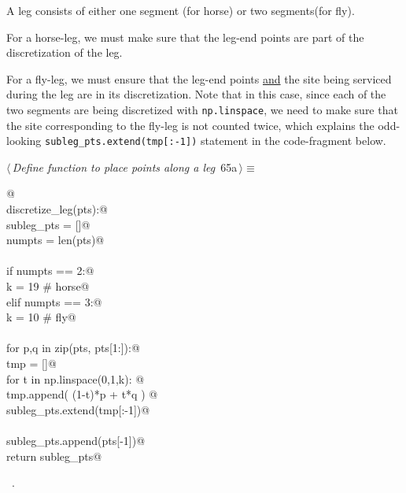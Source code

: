 \documentclass[11.5pt]{report}
\begin{document}
A leg consists of either one segment (for horse) or two segments(for fly). 

For a horse-leg, we must make sure that the leg-end points are part of the discretization of the leg. 

For a fly-leg, we must ensure that the leg-end points \underline{and} the site being 
serviced during the leg are in its discretization. Note that in this case, 
since each of the two segments are being discretized with \verb|np.linspace|, we need
to make sure that the site corresponding to the fly-leg is not counted twice, which
explains the odd-looking \verb|subleg_pts.extend(tmp[:-1])| statement in the code-fragment below. 

\begin{flushleft} \small
\begin{minipage}{\linewidth}\label{scrap97}\raggedright\small
{} $\langle\,${\itshape Define function to place points along a leg}\nobreak\ {\footnotesize {65a}}$\,\rangle\equiv$
\vspace{-1ex}
\begin{list}{}{} \item
\mbox{}\verb@   @\\
\mbox{}\verb@def discretize_leg(pts):@\\
\mbox{}\verb@   subleg_pts = []@\\
\mbox{}\verb@   numpts     = len(pts)@\\
\mbox{}\verb@@\\
\mbox{}\verb@   if numpts == 2:@\\
\mbox{}\verb@       k  = 19 # horse@\\
\mbox{}\verb@   elif numpts == 3:@\\
\mbox{}\verb@       k  = 10 # fly@\\
\mbox{}\verb@@\\
\mbox{}\verb@   for p,q in zip(pts, pts[1:]):@\\
\mbox{}\verb@       tmp = []@\\
\mbox{}\verb@       for t in np.linspace(0,1,k): @\\
\mbox{}\verb@           tmp.append( (1-t)*p + t*q ) @\\
\mbox{}\verb@       subleg_pts.extend(tmp[:-1])@\\
\mbox{}\verb@@\\
\mbox{}\verb@   subleg_pts.append(pts[-1])@\\
\mbox{}\verb@   return subleg_pts@\\
\mbox{}\verb@@{\NWsep}
\end{list}
\vspace{-1.5ex}
\footnotesize
\begin{list}{}{\setlength{\itemsep}{-\parsep}\setlength{\itemindent}{-\leftmargin}}
\item \NWtxtMacroRefIn\ .

\item{}
\end{list}
\end{minipage}\vspace{4ex}
\end{flushleft}
\end{document}
